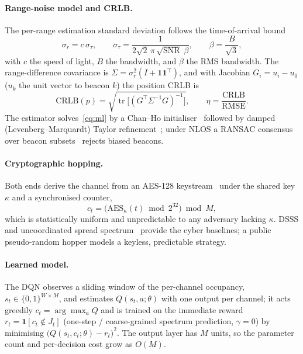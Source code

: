 \documentclass[11pt]{article}
\begin{document}
\paragraph{Range-noise model and CRLB.}
The per-range estimation standard deviation follows the time-of-arrival
bound~\cite{ref27}
\begin{equation}
\sigma_r = c\,\sigma_\tau, \qquad
\sigma_\tau = \frac{1}{2\sqrt{2}\,\pi\,\sqrt{\mathrm{SNR}}\;\beta},
\qquad \beta = \frac{B}{\sqrt3},
\label{eq:sigma}
\end{equation}
with $c$ the speed of light, $B$ the bandwidth, and $\beta$ the RMS bandwidth.
The range-difference covariance is $\Sigma=\sigma_r^2(I+\mathbf{1}\mathbf{1}^\top)$,
and with Jacobian $G_{i}=u_i-u_0$ ($u_k$ the unit vector to beacon $k$) the
position CRLB is
\begin{equation}
\mathrm{CRLB}(p) = \sqrt{\operatorname{tr}\!\big[(G^\top\Sigma^{-1}G)^{-1}\big]},
\qquad
\eta = \frac{\mathrm{CRLB}}{\mathrm{RMSE}} .
\label{eq:crlb}
\end{equation}
The estimator solves~\eqref{eq:ml} by a Chan--Ho initialiser~\cite{ref6}
followed by damped (Levenberg--Marquardt) Taylor refinement~\cite{ref8}; under
NLOS a RANSAC consensus over beacon subsets~\cite{ref28,ref38} rejects biased beacons.

\paragraph{Cryptographic hopping.}
Both ends derive the channel from an AES-128 keystream~\cite{ref20,ref22} under the
shared key $\kappa$ and a synchronised counter,
\begin{equation}
c_t = \big(\mathrm{AES}_\kappa(t) \bmod 2^{32}\big) \bmod M ,
\label{eq:crypto}
\end{equation}
which is statistically uniform and unpredictable to any adversary lacking
$\kappa$. DSSS and uncoordinated spread spectrum~\cite{ref2} provide the cyber
baselines; a public pseudo-random hopper models a keyless, predictable strategy.

\paragraph{Learned model.}
The DQN observes a sliding window of the per-channel occupancy,
$s_t\in\{0,1\}^{W\times M}$, and estimates $Q(s_t,a;\theta)$ with one output per
channel; it acts greedily $c_t=\arg\max_a Q$ and is trained on the immediate
reward $r_t=\mathbf 1[c_t\notin J_t]$ (one-step / coarse-grained spectrum
prediction, $\gamma{=}0$) by minimising $\big(Q(s_t,c_t;\theta)-r_t\big)^2$. The
output layer has $M$ units, so the parameter count and per-decision cost grow as
$O(M)$.
\end{document}
